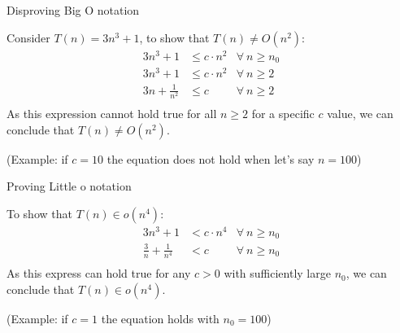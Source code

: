 \documentclass{article}
\begin{document}
\begin{example}
    {Disproving Big O notation}

    Consider $T(n) = 3n^3 + 1$, to show that $T(n) \neq O(n^2)$:
    \begin{align*}
        3n^3 + 1           & \leq c \cdot n^2 & \forall\ n \geq n_0 \\
        3n^3 + 1           & \leq c\cdot n^2  & \forall\ n \geq 2   \\
        3n + \frac{1}{n^2} & \leq c           & \forall\ n \geq 2   \\
    \end{align*}
    As this expression cannot hold true for all $n \geq 2$ for a specific $c$ value, we can conclude that $T(n) \neq O(n^2)$.

    (Example: if $c = 10$ the equation does not hold when let's say $n = 100$)
\end{example}

\begin{example}
    {Proving Little o notation}

    To show that $T(n) \in o(n^4)$:
    \begin{align*}
        3n^3 + 1                    & < c \cdot n^4 & \forall\ n \geq n_0 \\
        \frac{3}{n} + \frac{1}{n^4} & < c           & \forall\ n \geq n_0 \\
    \end{align*}
    As this express can hold true for any $c > 0$ with sufficiently large $n_0$, we can conclude that $T(n) \in o(n^4)$.

    (Example: if $c = 1$ the equation holds with $n_0 = 100$)
\end{example}
\end{document}
